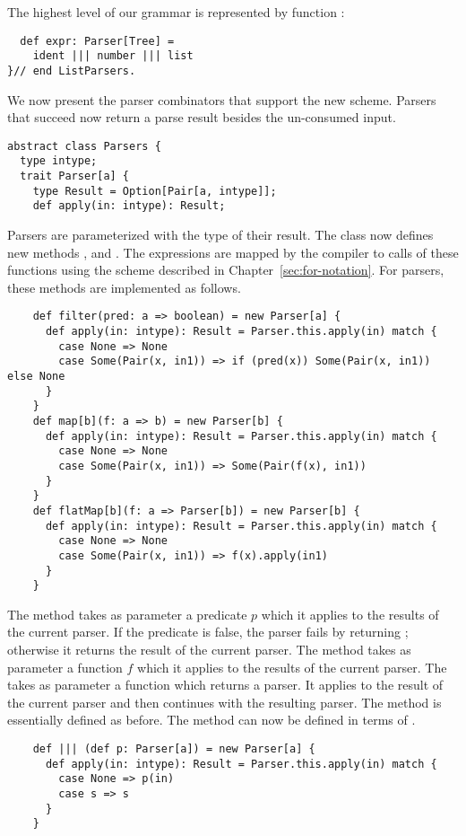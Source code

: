 \documentclass[a4paper,12pt,twoside,titlepage]{book}
\begin{document}
{The highest level of our grammar is represented by function
:
\begin{lstlisting}
  def expr: Parser[Tree] = 
    ident ||| number ||| list
}// end ListParsers.
\end{lstlisting}
We now present the parser combinators that support the new
scheme. Parsers that succeed now return a parse result besides the
un-consumed input.
\begin{lstlisting}
abstract class Parsers {
  type intype;
  trait Parser[a] {
    type Result = Option[Pair[a, intype]];
    def apply(in: intype): Result;
\end{lstlisting}
Parsers are parameterized with the type of their result. The class
 now defines new methods , 
and . The  expressions are mapped by the
compiler to calls of these functions using the scheme described in
Chapter~\ref{sec:for-notation}. For parsers, these methods are
implemented as follows.
\begin{lstlisting}
    def filter(pred: a => boolean) = new Parser[a] {
      def apply(in: intype): Result = Parser.this.apply(in) match {
        case None => None
        case Some(Pair(x, in1)) => if (pred(x)) Some(Pair(x, in1)) else None
      }
    }
    def map[b](f: a => b) = new Parser[b] {
      def apply(in: intype): Result = Parser.this.apply(in) match {
        case None => None
        case Some(Pair(x, in1)) => Some(Pair(f(x), in1))
      }
    }
    def flatMap[b](f: a => Parser[b]) = new Parser[b] {
      def apply(in: intype): Result = Parser.this.apply(in) match {
        case None => None
        case Some(Pair(x, in1)) => f(x).apply(in1)
      }
    }
\end{lstlisting}
The  method takes as parameter a predicate $p$ which it
applies to the results of the current parser. If the predicate is
false, the parser fails by returning ; otherwise it returns
the result of the current parser.  The  method takes as
parameter a function $f$ which it applies to the results of the
current parser. The  takes as parameter a function
 which returns a parser.  It applies  to the result of
the current parser and then continues with the resulting parser.  The
\code{|||} method is essentially defined as before.  The
\code{&&&} method can now be defined in terms of .
\begin{lstlisting}
    def ||| (def p: Parser[a]) = new Parser[a] {
      def apply(in: intype): Result = Parser.this.apply(in) match {
        case None => p(in)
        case s => s
      }
    }


\end{lstlisting}}
\end{document}
